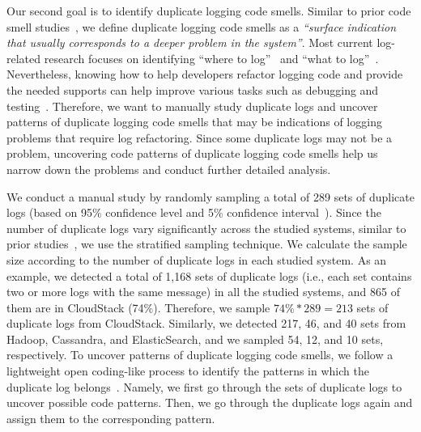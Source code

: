 Our second goal is to identify duplicate logging code smells. Similar to prior code smell studies~\cite{budgen2003software, fowler1999refactoring}, we define duplicate logging code smells as a {\em ``surface indication that usually corresponds to a deeper problem in the system''}. Most current log-related research focuses on identifying ``where to log''~\cite{Yuan:2010:SED:1736020.1736038, Zhu:2015:LLH:2818754.2818807, kundi_icpe_2018} and ``what to log''~\cite{Yuan:2011:ISD:1950365.1950369, Shang:2014:ULL:2705615.2706065}. Nevertheless, knowing how to help developers refactor logging code and provide the needed supports can help improve various tasks such as debugging and testing~\cite{Shang:2014:ULL:2705615.2706065, Chen:2017:ALT:3103112.3103144}. %
Therefore, we want to manually study duplicate logs and uncover patterns of duplicate logging code smells that may be indications of logging problems that require log refactoring. Since some duplicate logs may not be a problem, uncovering code patterns of duplicate logging code smells help us narrow down the problems and conduct further detailed analysis.%



We conduct a manual study by randomly sampling a total of 289 sets of duplicate logs (based on 95\% confidence level and 5\% confidence interval~\cite{boslaugh2008statistics}). Since the number of duplicate logs vary significantly across the studied systems, similar to prior studies~\cite{log_pattern_ICSE2017, boslaugh2008statistics}, we use the stratified sampling technique. We calculate the sample size according to the number of duplicate logs in each studied system. As an example, we detected a total of 1,168 sets of duplicate logs (i.e., each set contains two or more logs with the same message) in all the studied systems, and 865 of them are in CloudStack (74\%). Therefore, we sample $74\% * 289 = 213$ sets of duplicate logs from CloudStack. Similarly, we detected 217, 46, and 40 sets from Hadoop, Cassandra, and ElasticSearch, and we sampled 54, 12, and 10 sets, respectively. To uncover patterns of duplicate logging code smells, we follow a lightweight open coding-like process to identify the patterns in which the duplicate log belongs~\cite{seaman1999qualitative}. Namely, we first go through the sets of duplicate logs to uncover possible code patterns. %
Then, we go through the duplicate logs again and assign them to the corresponding pattern. 

